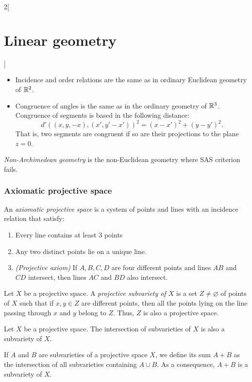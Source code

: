 \documentclass[../../../main.tex]{subfiles}
\begin{document}
\begin{multicols}{2}[\section{Linear geometry}]
\begin{prop}
\begin{itemize}
      \item Incidence and order relations are the same as in ordinary Euclidean geometry of $\mathbb{R}^2$.
      \item Congruence of angles is the same as in the ordinary geometry of $\mathbb{R}^3$. Congruence of segments is based in the following distance:  $$d'((x,y,-x),(x',y'-x'))^2=(x-x')^2+(y-y')^2.$$ That is, two segments are congruent if so are their projections to the plane $z=0$.
    \end{itemize}
  \end{prop}
  \begin{definition}
    \textit{Non-Archimedean geometry} is the non-Euclidean geometry where SAS criterion fails.
  \end{definition}
  \subsubsection{Axiomatic projective space}
  \begin{definition}
    An \textit{axiomatic projective space} is a system of points and lines with an incidence relation that satisfy:
    \begin{enumerate}
      \item Every line contains at least 3 points
      \item Any two distinct points lie on a unique line.
      \item \textit{(Projective axiom)} If $A,B,C,D$ are four different points and lines $AB$ and $CD$ intersect, then lines $AC$ and $BD$ also intersect.
    \end{enumerate}
  \end{definition}
  \begin{definition}
    Let $X$ be a projective space. A \textit{projective subvariety of $X$} is a set $Z\ne\varnothing$ of points of $X$ such that if $x,y\in Z$ are different points, then all the points lying on the line passing through $x$ and $y$ belong to $Z$. Thus, $Z$ is also a projective space.
  \end{definition}
  \begin{prop}
    Let $X$ be a projective space. The intersection of subvarieties of $X$ is also a subvariety of $X$.
  \end{prop}
  \begin{prop}
    If $A$ and $B$ are subvarieties of a projective space $X$, we define its sum $A+B$ as the intersection of all subvarieties containing $A\cup B$. As a consequence, $A+B$ is a subvariety of $X$.

\end{prop}
\end{multicols}
\end{document}
